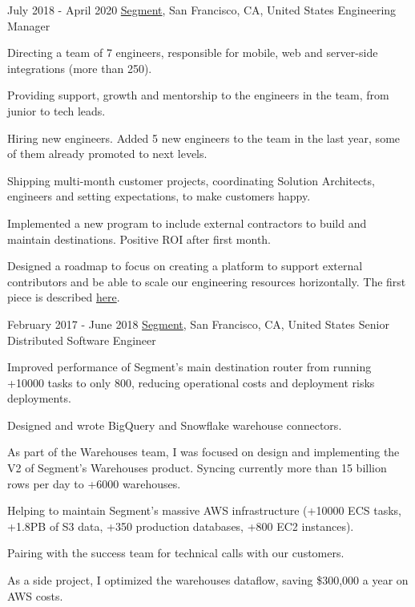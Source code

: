 \experience
  {July 2018 - April 2020}
  {\href{https://segment.com}{Segment}, San Francisco, CA, United States}
  {Engineering Manager}
  {\vspace{-1em}\begin{rlist}
    \item Directing a team of 7 engineers, responsible for mobile, web and server-side integrations (more than 250).
    \item Providing support, growth and mentorship to the engineers in the team, from junior to tech leads.
    \item Hiring new engineers. Added 5 new engineers to the team in the last year, some of them already promoted to next levels.
    \item Shipping multi-month customer projects, coordinating Solution Architects, engineers and setting expectations, to make customers happy.
    \item Implemented a new program to include external contractors to build and maintain destinations. Positive ROI after first month.
    \item Designed a roadmap to focus on creating a platform to support external contributors and be able to scale our engineering resources
    horizontally. The first piece is described \href{https://segment.com/blog/unleashing-the-power-of-raw-data-with-amazon-lambda/}{here}.
  \end{rlist}}
  
\experience
  {February 2017 - June 2018}
  {\href{https://segment.com}{Segment}, San Francisco, CA, United States}
  {Senior Distributed Software Engineer}
  {\vspace{-1em}\begin{rlist}
    \item Improved performance of Segment's main destination router from running +10000 tasks to only 800, reducing operational
    costs and deployment risks deployments.
    \item Designed and wrote BigQuery and Snowflake warehouse connectors.
    \item As part of the Warehouses team, I was focused on design and implementing the V2 of Segment's Warehouses 
    product. Syncing currently more than 15 billion rows per day to +6000 warehouses.
    \item Helping to maintain Segment's massive AWS infrastructure (+10000 ECS tasks, +1.8PB of S3 data,
    +350 production databases, +800 EC2 instances).
    \item Pairing with the success team for technical calls with our customers. 
    \item As a side project, I optimized the warehouses dataflow, saving \$300,000 a year on AWS costs.
  \end{rlist}}

